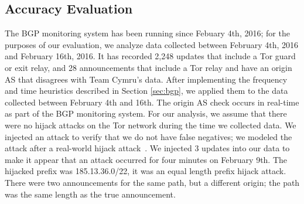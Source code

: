

\subsection{Accuracy Evaluation}
\label{sec:eval}
The BGP monitoring system has been running since Febuary 4th, 2016; for the purposes of our evaluation, we analyze data collected between February 4th, 2016 and February 16th, 2016.  It has recorded 2,248 updates that include a Tor guard or exit relay, and 28 announcements that include a Tor relay and have an origin AS that disagrees with Team Cymru's data.  After implementing the frequency and time heuristics described in Section \ref{sec:bgp}, we applied them to the data collected between February 4th and 16th.  The origin AS check occurs in real-time as part of the BGP monitoring system.  For our analysis, we assume that there were no hijack attacks on the Tor network during the time we collected data.  We injected an attack to verify that we do not have false negatives; we modeled the attack after a real-world hijack attack~\cite{syriahijack}.  We injected 3 updates into our data to make it appear that an attack occurred for four minutes on February 9th.  The hijacked prefix was 185.13.36.0/22, it was an equal length prefix hijack attack.  There were two announcements for the same path, but a different origin; the path was the same length as the true announcement.  


